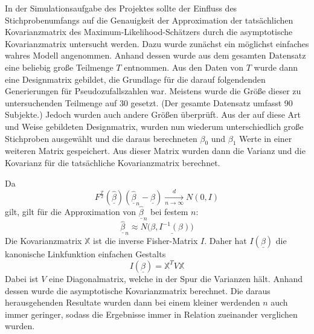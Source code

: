 In der Simulationsaufgabe des Projektes sollte der Einfluss des Stichprobenumfangs auf die Genauigkeit der Approximation der tats\"achlichen Kovarianzmatrix des Maximum-Likelihood-Sch\"atzers durch die asymptotische Kovarianzmatrix untersucht werden.
Dazu wurde zun\"achst ein m\"oglichst einfaches wahres Modell angenommen. Anhand dessen wurde aus dem gesamten Datensatz eine beliebig gro\ss{}e Teilmenge $T$ entnommen. Aus den Daten von $T$ wurde dann eine Designmatrix gebildet, die Grundlage f\"ur die darauf folgendenden Generierungen für Pseudozufallszahlen war. Meistens wurde die Gr\"o\ss{}e dieser zu untersuchenden Teilmenge auf 30 gesetzt. (Der gesamte Datensatz umfasst 90 Subjekte.) Jedoch wurden auch andere Gr\"o\ss{}en \"uberpr\"uft. Aus der auf diese Art und Weise gebildeten Designmatrix, wurden nun wiederum unterschiedlich gro\ss{}e Stichproben ausgew\"ahlt und die daraus berechneten $\beta_0$ und $\beta_1$ Werte in einer weiteren Matrix gespeichert. Aus dieser Matrix wurden dann die Varianz und die Kovarianz f\"ur die tats\"achliche Kovarianzmatrix berechnet. \\
\par\smallskip
Da
\begin{equation}
F^{\frac{T}{2}}(\underline{\hat{\beta}}) (\underline{\hat{\beta}}_n - \underline{\beta})
\xrightarrow[n \rightarrow \infty]{d}
N(0,I)
\end{equation}
gilt, gilt f\"ur die Approximation von $\underline{\hat{\beta}}_n$ bei festem $n$:
\begin{equation}
\underline{\hat{\beta}}_n \approx N(\underline{\beta, I^{-1}(\beta))}
\end{equation}
Die Kovarianzmatrix $\mathbb{X}$ ist die inverse Fisher-Matrix $I$. Daher hat $I(\underline{\beta})$ die kanonische Linkfunktion einfachen Gestalts
\begin{equation}
I(\underline{\beta}) = \mathbb{X}^T V \mathbb{X}
\end{equation}
Dabei ist $V$ eine Diagonalmatrix, welche in der Spur die Varianzen h\"alt.
Anhand dessen wurde die asymptotische Kovarianzmatrix berechnet.
Die daraus herausgehenden Resultate wurden dann bei einem kleiner werdenden $n$ auch immer geringer, sodass die Ergebnisse immer in Relation zueinander verglichen wurden. 
